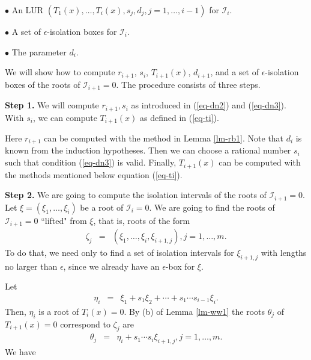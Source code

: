 \documentclass[amsthm]{JSC_LaTex_2007_Mar_12/elsart}
\def\bref#1{(\ref{#1})}
\def\IS{{\mathcal{I}}}
\begin{document}
\quad$\bullet$ An LUR $(T_1(x),\ldots,T_i(x), s_j,d_j,
j=1,\ldots,i-1)$ for $\IS_i$.

\quad$\bullet$ A set of $\epsilon$-isolation boxes for $\IS_i$.

\quad$\bullet$ The parameter $d_i$.

We will show how to compute  $r_{i+1}$, $s_i$, $T_{i+1}(x)$,
$d_{i+1}$, and a set of $\epsilon$-isolation boxes of the roots of
$\IS_{i+1}=0$. The procedure consists of three steps.



{\bf Step 1.} We will compute $r_{i+1},s_{i}$ as introduced in
\bref{eq-dn2} and \bref{eq-dn3}. With $s_{i}$, we can compute
$T_{i+1}(x)$ as defined in \bref{eq-ti}.

Here $r_{i+1}$ can be computed with the method in Lemma
\ref{lm-rb1}. Note that $d_i$ is known from the induction
hypotheses. Then we can choose a rational number $s_i$ such that
condition \bref{eq-dn3} is valid. Finally, $T_{i+1}(x)$ can be
computed with the methods mentioned below equation \bref{eq-ti}.

{\bf Step 2.} We are going to compute the isolation intervals of the
roots of $\IS_{i+1}=0$. Let  $\xi=(\xi_1,\ldots,\xi_i)$ be a root of
$\IS_i=0$. We are going to find the roots of $\IS_{i+1}=0$ ``lifted"
from $\xi$, that is, roots of the form
\begin{eqnarray}\label{eq-n10}\zeta_j&=&(\xi_1,\ldots,\xi_i,\xi_{i+1,j}),j=1,\ldots,m.\end{eqnarray}
To do that, we need only to find a set of isolation intervals for
$\xi_{i+1,j}$ with lengths no larger than $\epsilon$, since we
already have an $\epsilon$-box for $\xi$.

Let
\begin{eqnarray}\label{eq-n11}
   \eta_i&=&\xi_1+s_1\xi_2+\cdots+s_1\cdots s_{i-1}\xi_{i}.\nonumber
\end{eqnarray}
Then, $\eta_i$ is a root of $T_{i}(x)=0$.
By (b) of Lemma \ref{lm-ww1} the roots $\theta_j$ of $T_{i+1}(x)=0$
correspond to $\zeta_j$ are
\begin{eqnarray}\label{eq-n12}
 \theta_j&=&\eta_i + s_1\cdots s_{i}\xi_{i+1,j},j=1,\ldots,m.
\end{eqnarray}
We have
\end{document}
